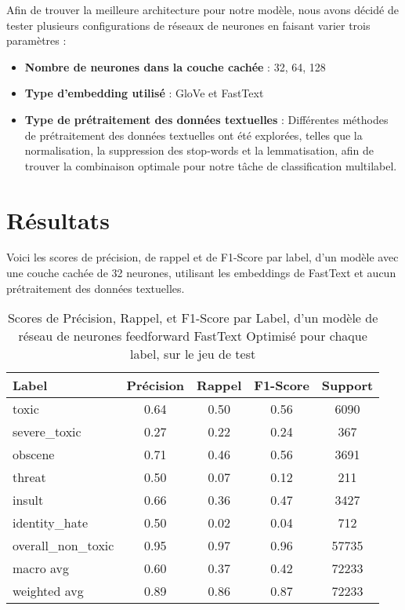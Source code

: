 Afin de trouver la meilleure architecture pour notre modèle, nous avons décidé de tester plusieurs configurations de réseaux de neurones en faisant varier trois paramètres :

\begin{itemize}
    \item \textbf{Nombre de neurones dans la couche cachée} : 32, 64, 128
    \item \textbf{Type d'embedding utilisé} : GloVe et FastText
    \item \textbf{Type de prétraitement des données textuelles} : Différentes méthodes de prétraitement des données textuelles ont été explorées, telles que la normalisation, la suppression des stop-words et la lemmatisation, afin de trouver la combinaison optimale pour notre tâche de classification multilabel.
\end{itemize}


\section{Résultats}

Voici les scores de précision, de rappel et de F1-Score par label, d'un modèle avec une couche cachée de 32 neurones, utilisant les embeddings de FastText et aucun prétraitement des données textuelles.

\begin{table}[ht]
    \centering
    \caption{Scores de Précision, Rappel, et F1-Score par Label, d'un modèle de réseau de neurones feedforward FastText Optimisé pour chaque label, sur le jeu de test}    \begin{tabular}{lcccc}
    \hline
    \textbf{Label} & \textbf{Précision} & \textbf{Rappel} & \textbf{F1-Score} & \textbf{Support} \\ \hline
    toxic          & 0.64               & 0.50            & 0.56              & 6090             \\
    severe\_toxic  & 0.27               & 0.22            & 0.24              & 367              \\
    obscene        & 0.71               & 0.46            & 0.56              & 3691             \\
    threat         & 0.50               & 0.07            & 0.12              & 211              \\
    insult         & 0.66               & 0.36            & 0.47              & 3427             \\
    identity\_hate & 0.50               & 0.02            & 0.04              & 712              \\
    overall\_non\_toxic & 0.95           & 0.97            & 0.96              & 57735            \\\hline
    macro avg      & 0.60              & 0.37            & 0.42              & 72233            \\
    weighted avg   & 0.89               & 0.86            & 0.87              & 72233            \\ \hline
    \end{tabular}
    \label{tab:scores}
\end{table}

